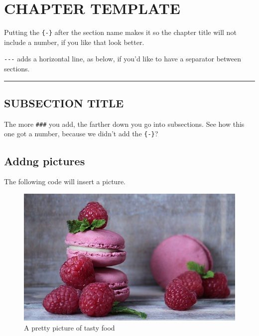 \documentclass[
]{book}
\begin{document}
\hypertarget{chapter-template}{%
\chapter*{CHAPTER TEMPLATE}\label{chapter-template}}


Putting the \texttt{\{-\}} after the section name makes it so the chapter title will not include a number, if you like that look better.

\texttt{-\/-\/-} adds a horizontal line, as below, if you'd like to have a separator between sections.

\begin{center}\rule{0.5\linewidth}{0.5pt}\end{center}

\hypertarget{subsection-title}{%
\section{SUBSECTION TITLE}\label{subsection-title}}

The more \texttt{\#\#\#} you add, the farther down you go into subsections.
See how this one got a number, because we didn't add the \texttt{\{-\}}?

\hypertarget{picturetemplate}{%
\section*{Addng pictures}\label{picturetemplate}}


The following code will insert a picture.

\begin{figure}
\centering
\includegraphics{images/macarons.jpg}
\caption{\label{fig:example-macarons}A pretty picture of tasty food}
\end{figure}
\end{document}
